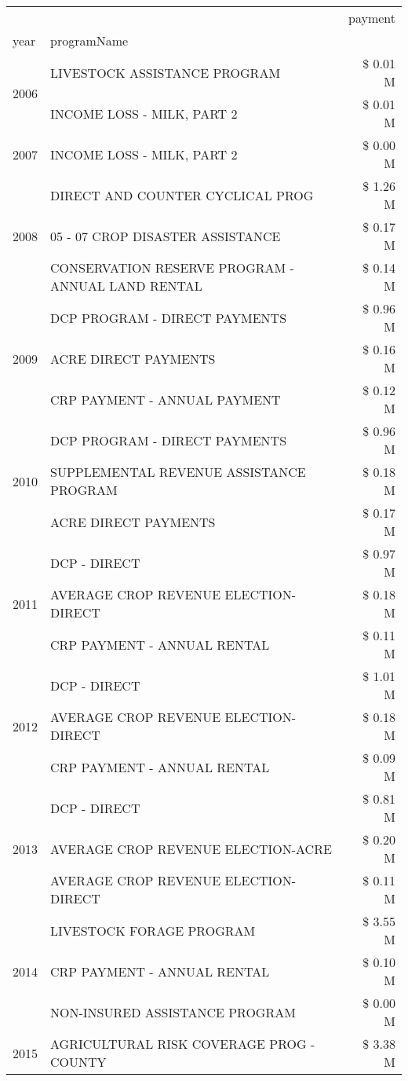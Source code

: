 \begin{tabular}{llr}
\toprule
 &  & payment \\
year & programName &  \\
\midrule
\multirow[t]{2}{*}{2006} & LIVESTOCK ASSISTANCE PROGRAM & \$ 0.01 M \\
 & INCOME LOSS - MILK, PART 2 & \$ 0.01 M \\
\cline{1-3}
2007 & INCOME LOSS - MILK, PART 2 & \$ 0.00 M \\
\cline{1-3}
\multirow[t]{3}{*}{2008} & DIRECT AND COUNTER CYCLICAL PROG & \$ 1.26 M \\
 & 05 - 07 CROP DISASTER ASSISTANCE & \$ 0.17 M \\
 & CONSERVATION RESERVE PROGRAM - ANNUAL LAND RENTAL & \$ 0.14 M \\
\cline{1-3}
\multirow[t]{3}{*}{2009} & DCP PROGRAM - DIRECT PAYMENTS & \$ 0.96 M \\
 & ACRE DIRECT PAYMENTS & \$ 0.16 M \\
 & CRP PAYMENT - ANNUAL PAYMENT & \$ 0.12 M \\
\cline{1-3}
\multirow[t]{3}{*}{2010} & DCP PROGRAM - DIRECT PAYMENTS & \$ 0.96 M \\
 & SUPPLEMENTAL REVENUE ASSISTANCE PROGRAM & \$ 0.18 M \\
 & ACRE DIRECT PAYMENTS & \$ 0.17 M \\
\cline{1-3}
\multirow[t]{3}{*}{2011} & DCP - DIRECT & \$ 0.97 M \\
 & AVERAGE CROP REVENUE ELECTION-DIRECT & \$ 0.18 M \\
 & CRP PAYMENT - ANNUAL RENTAL & \$ 0.11 M \\
\cline{1-3}
\multirow[t]{3}{*}{2012} & DCP - DIRECT & \$ 1.01 M \\
 & AVERAGE CROP REVENUE ELECTION-DIRECT & \$ 0.18 M \\
 & CRP PAYMENT - ANNUAL RENTAL & \$ 0.09 M \\
\cline{1-3}
\multirow[t]{3}{*}{2013} & DCP - DIRECT & \$ 0.81 M \\
 & AVERAGE CROP REVENUE ELECTION-ACRE & \$ 0.20 M \\
 & AVERAGE CROP REVENUE ELECTION-DIRECT & \$ 0.11 M \\
\cline{1-3}
\multirow[t]{3}{*}{2014} & LIVESTOCK FORAGE PROGRAM & \$ 3.55 M \\
 & CRP PAYMENT - ANNUAL RENTAL & \$ 0.10 M \\
 & NON-INSURED ASSISTANCE PROGRAM & \$ 0.00 M \\
\cline{1-3}
\multirow[t]{3}{*}{2015} & AGRICULTURAL RISK COVERAGE PROG - COUNTY & \$ 3.38 M \\

\end{tabular}
